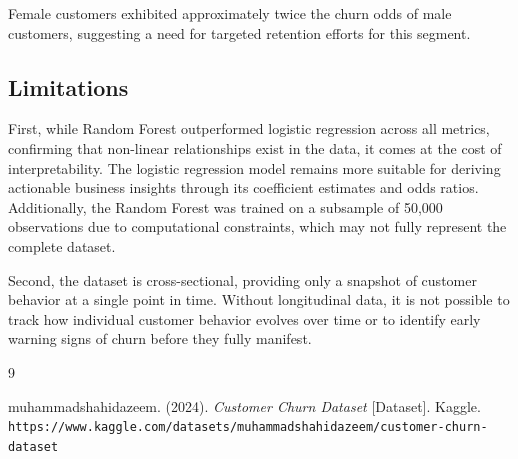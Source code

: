 \documentclass[12pt]{article}
\begin{document}
Female customers exhibited approximately twice the churn odds of male customers, 
suggesting a need for targeted retention efforts for this segment.

\subsection{Limitations}

First, while Random Forest outperformed logistic regression across all metrics, 
confirming that non-linear relationships exist in the data, it comes at the 
cost of interpretability. The logistic regression model remains more suitable 
for deriving actionable business insights through its coefficient estimates 
and odds ratios. Additionally, the Random Forest was trained on a subsample 
of 50,000 observations due to computational constraints, which may not fully 
represent the complete dataset.

Second, the dataset is cross-sectional, providing only a snapshot of customer 
behavior at a single point in time. Without longitudinal data, it is not possible 
to track how individual customer behavior evolves over time or to identify early 
warning signs of churn before they fully manifest.

\begin{thebibliography}{9}

muhammadshahidazeem. (2024).
\textit{Customer Churn Dataset} [Dataset].
Kaggle.
\texttt{https://www.kaggle.com/datasets/muhammadshahidazeem/customer-churn-dataset}

\end{thebibliography}
\end{document}
